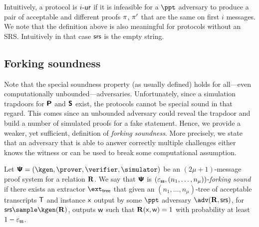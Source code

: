 \documentclass[runningheads,10pt]{llncs}
\let\spvec\vec
\let\vec\accentvec
\let\spvec\vec
\let\vec\spvec
\def\vec#1{\mathchoice{\mbox{\boldmath$\displaystyle#1$}}
  {\mbox{\boldmath$\textstyle#1$}} {\mbox{\boldmath$\scriptstyle#1$}}
  {\mbox{\boldmath$\scriptscriptstyle#1$}}}
\begin{document}
\begin{definition}[$\ur{i}$-protocol]
\end{definition}
Intuitively, a protocol is $\ur{i}$ if it is infeasible for a $\ppt$ adversary
to produce a pair of acceptable and different proofs $\pi$, $\pi'$
that are the same on  first $i$ messages. 
We note that the definition above is also meaningful for protocols without an SRS. Intuitively in that case $\mathsf{srs}$ is the empty string.

\iffalse
\subsection{Forking soundness}
Note that the special soundness property (as usually defined) holds for
all---even computationally unbounded---adversaries. Unfortunately, since a
simulation trapdoors for $\bm{\mathsf{P}}$ and $\bm{\mathsf{S}}$ exist, the protocols
cannot be special sound in that regard. This comes since an unbounded adversary
could reveal the trapdoor and build a number of simulated proofs for a fake
statement. Hence, we provide a weaker, yet sufficient, definition of
\emph{forking soundness}. More precisely, we state that an
adversary that is able to answer correctly multiple challenges either knows the
witness or can be used to break some computational assumption.

\begin{definition}
  Let $\proofsystem = (\kgen, \prover, \verifier, \simulator)$ be an
  $(2 \mu + 1)$-message proof system for a relation $\mathbf{R}$. We say that
  $\bm{\mathsf{\Psi}}$ is $(\varepsilon_{\mathsf{ss}}, (n_1, \ldots, n_\mu))$-\emph{forking sound}
  if there exists an extractor $\extt$ that given an $(n_1, \ldots, n_\mu)$-tree
  of acceptable transcripts $\mathsf{T}$ and instance $\mathsf{x}$ output by some $\ppt$ adversary $\adv(\REL,
  \srs)$, for $\srs \sample \kgen(\REL)$, outputs $\mathsf{w}$ such that $\mathbf{R}(\mathsf{x},
  \mathsf{w}) = 1$ with probability at least $1 - \varepsilon_{\mathsf{ss}}$.
\end{definition}
\end{document}
